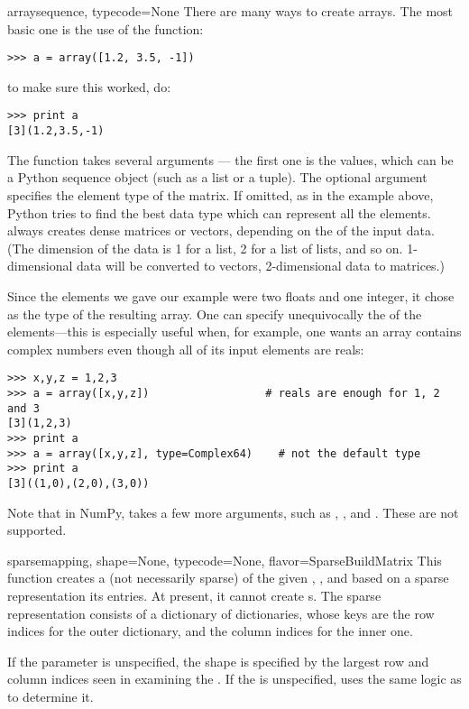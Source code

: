 \begin{funcdesc}{array}{sequence, typecode=None}
   There are many ways to create arrays. The most basic one is the use of the
    function:
\begin{verbatim}
>>> a = array([1.2, 3.5, -1])
\end{verbatim}
   to make sure this worked, do:
\begin{verbatim}
>>> print a
[3](1.2,3.5,-1)
\end{verbatim}
   The  function takes several arguments --- the first
   one is the values, which can be a Python sequence object (such as a
   list or a tuple).  The optional argument  specifies the
   element type of the matrix. If omitted, as in the example above,
   Python tries to find the best data type which can represent all the
   elements.  always creates dense matrices or
   vectors, depending on the  of
   the input data.  (The dimension of the data is 1 for a list, 2 for a
   list of lists, and so on.  1-dimensional data will be converted to
   vectors, 2-dimensional data to matrices.)
   
   Since the elements we gave our example were two floats and one integer, it
   chose  as the type of the resulting array. One can specify
   unequivocally the  of the elements---this is especially 
   useful when, for example, one wants an array contains complex numbers even
   though all of its input elements are reals:
\begin{verbatim}
>>> x,y,z = 1,2,3
>>> a = array([x,y,z])                  # reals are enough for 1, 2 and 3
[3](1,2,3)
>>> print a
>>> a = array([x,y,z], type=Complex64)    # not the default type
>>> print a
[3]((1,0),(2,0),(3,0))
\end{verbatim}
    Note that in NumPy,  takes a few more arguments, such as
    , , and . These are not supported.
\end{funcdesc}

\begin{funcdesc}{sparse}{mapping, shape=None, typecode=None, flavor=SparseBuildMatrix}
  This function creates a (not necessarily sparse)  of
  the given , , and  based on
  a sparse representation its entries. At present, it cannot create
  s. The sparse representation consists of a dictionary
  of dictionaries, whose keys are the row indices for the outer dictionary,
  and the column indices for the inner one.

  If the  parameter is unspecified, the shape is specified by
  the largest row and column indices seen in examining the .
  If the  is unspecified,  uses the same
  logic as  to determine it.
\end{funcdesc}

